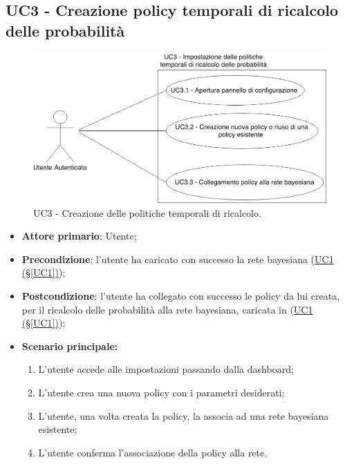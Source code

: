 \subsection{UC3 - Creazione policy temporali di ricalcolo delle probabilità}\label{UC3}

\begin{figure}[H]
\centering
\includegraphics[scale=0.3]{./images/UC3.png}
\caption{UC3 - Creazione delle politiche temporali di ricalcolo.}
\end{figure}

\begin{itemize}
	\item \textbf{Attore primario}: Utente; 
	\item \textbf{Precondizione}: l'utente ha caricato con successo la rete bayesiana (\hyperref[UC1]{UC1 (§\ref*{UC1})});
	\item \textbf{Postcondizione}: l'utente ha collegato con successo le policy da lui creata, per il ricalcolo delle probabilità alla rete bayesiana, caricata in (\hyperref[UC1]{UC1 (§\ref*{UC1})});	
	\item \textbf{Scenario principale:}

	\begin{enumerate}
		\item L'utente accede alle impostazioni passando dalla dashboard;
		\item L'utente crea una nuova policy con i parametri desiderati; 
		\item L'utente, una volta creata la policy, la associa  ad una rete bayesiana esistente;
		\item L'utente conferma l'associazione della policy alla rete.
	\end{enumerate}
	
\end{itemize}

